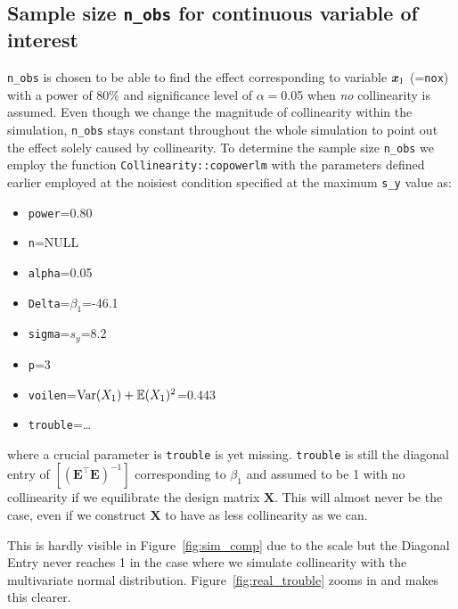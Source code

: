 \documentclass[11pt,a4paper,twoside]{book}\usepackage[]{graphicx}\usepackage[]{xcolor}
\begin{document}
\subsection{Sample size \texttt{n\_obs} for continuous variable of interest}

\texttt{n\_obs} is chosen to be able to find the effect corresponding to variable ${\textbf{\textit{x}}}_1$ (=\texttt{nox}) with a power of 80\% and significance level of $\alpha=$0.05 when \textit{no} collinearity is assumed. Even though we change the magnitude of collinearity within the simulation, \texttt{n\_obs} stays constant throughout the whole simulation to point out the effect solely caused by collinearity. To determine the sample size \texttt{n\_obs} we employ the function \texttt{Collinearity::copowerlm} with the parameters defined earlier employed at the noisiest condition specified at the maximum \texttt{s\_y} value as:
\begin{multicols}{2}
\begin{itemize}
\item \texttt{power}=0.80
\item \texttt{n}=NULL
\item \texttt{alpha}=0.05
\item \texttt{Delta}=$\beta_1$=-46.1
\item \texttt{sigma}=$s_y$=8.2
\item \texttt{p}=3
\item \texttt{voilen}=$\operatorname{Var}(X_1)+\operatorname{\mathbb{E}}(X_1)^2$=0.443
\item \texttt{trouble}=\dots
\end{itemize}
\end{multicols}
where a crucial parameter is \texttt{trouble} is yet missing. \texttt{trouble} is still the diagonal entry of $\left[\left(\boldsymbol{E^\top E}\right)^{-1}\right]$ corresponding to $\beta_1$ and assumed to be 1 with no collinearity if we equilibrate the design matrix $\boldsymbol{X}$. This will almost never be the case, even if we construct $\boldsymbol{X}$ to have as less collinearity as we can. 

This is hardly visible in Figure~\ref{fig:sim_comp} due to the scale  but the Diagonal Entry never reaches 1 in the case where we simulate collinearity with the multivariate normal distribution. Figure~\ref{fig:real_trouble} zooms in and makes this clearer.
\end{document}

